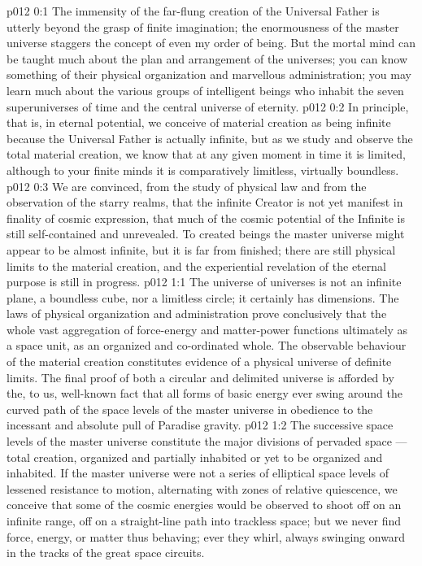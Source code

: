 \author{Perfector of Wisdom}
\vs p012 0:1 The immensity of the far\hyp{}flung creation of the Universal Father is utterly beyond the grasp of finite imagination; the enormousness of the master universe staggers the concept of even my order of being. But the mortal mind can be taught much about the plan and arrangement of the universes; you can know something of their physical organization and marvellous administration; you may learn much about the various groups of intelligent beings who inhabit the seven superuniverses of time and the central universe of eternity.
\vs p012 0:2 In principle, that is, in eternal potential, we conceive of material creation as being infinite because the Universal Father is actually infinite, but as we study and observe the total material creation, we know that at any given moment in time it is limited, although to your finite minds it is comparatively limitless, virtually boundless.
\vs p012 0:3 We are convinced, from the study of physical law and from the observation of the starry realms, that the infinite Creator is not yet manifest in finality of cosmic expression, that much of the cosmic potential of the Infinite is still self\hyp{}contained and unrevealed. To created beings the master universe might appear to be almost infinite, but it is far from finished; there are still physical limits to the material creation, and the experiential revelation of the eternal purpose is still in progress.
\vs p012 1:1 The universe of universes is not an infinite plane, a boundless cube, nor a limitless circle; it certainly has dimensions. The laws of physical organization and administration prove conclusively that the whole vast aggregation of force\hyp{}energy and matter\hyp{}power functions ultimately as a space unit, as an organized and co\hyp{}ordinated whole. The observable behaviour of the material creation constitutes evidence of a physical universe of definite limits. The final proof of both a circular and delimited universe is afforded by the, to us, well\hyp{}known fact that all forms of basic energy ever swing around the curved path of the space levels of the master universe in obedience to the incessant and absolute pull of Paradise gravity.
\vs p012 1:2 The successive space levels of the master universe constitute the major divisions of pervaded space --- total creation, organized and partially inhabited or yet to be organized and inhabited. If the master universe were not a series of elliptical space levels of lessened resistance to motion, alternating with zones of relative quiescence, we conceive that some of the cosmic energies would be observed to shoot off on an infinite range, off on a straight\hyp{}line path into trackless space; but we never find force, energy, or matter thus behaving; ever they whirl, always swinging onward in the tracks of the great space circuits.
